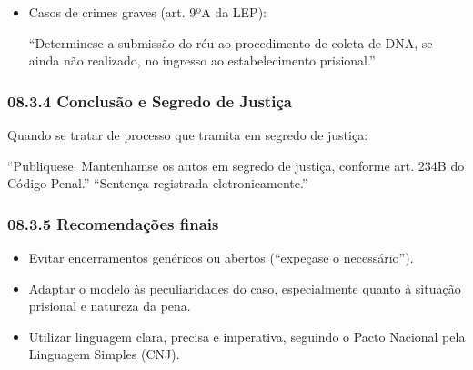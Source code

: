 \documentclass[letterpaper,10pt,brazil]{sphinxmanual}
\begin{document}
\begin{itemize}
\item {} 
\sphinxAtStartPar
Casos de crimes graves (art. 9º\sphinxhyphen{}A da LEP):

\begin{sphinxVerbatim}[commandchars=\\\{\}]
“Determine\PYGZhy{}se a submissão do réu ao procedimento de coleta de DNA, se ainda não realizado, no ingresso ao estabelecimento prisional.”
\end{sphinxVerbatim}

\end{itemize}


\subsubsection{08.3.4 \textendash{} Conclusão e Segredo de Justiça}
\label{\detokenize{08sentenca_disposicoesfinais:conclusao-e-segredo-de-justica}}
\sphinxAtStartPar
Quando se tratar de processo que tramita em segredo de justiça:

\sphinxAtStartPar
“Publique\sphinxhyphen{}se. Mantenham\sphinxhyphen{}se os autos em segredo de justiça, conforme art. 234\sphinxhyphen{}B do Código Penal.”
“Sentença registrada eletronicamente.”


\subsubsection{08.3.5 \textendash{} Recomendações finais}
\label{\detokenize{08sentenca_disposicoesfinais:recomendacoes-finais}}\begin{itemize}
\item {} 
\sphinxAtStartPar
Evitar encerramentos genéricos ou abertos (“expeça\sphinxhyphen{}se o necessário”).

\item {} 
\sphinxAtStartPar
Adaptar o modelo às peculiaridades do caso, especialmente quanto à situação prisional e natureza da pena.

\item {} 
\sphinxAtStartPar
Utilizar linguagem clara, precisa e imperativa, seguindo o Pacto Nacional pela Linguagem Simples (CNJ).

\end{itemize}
\end{document}
